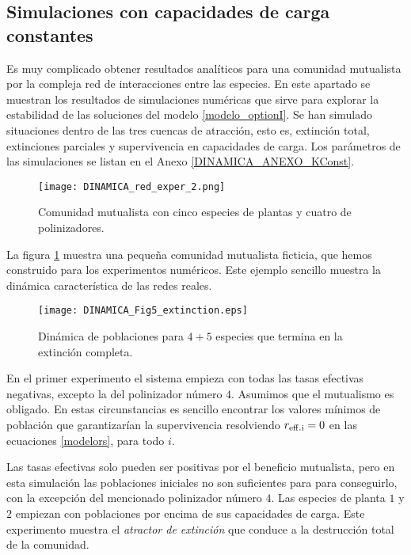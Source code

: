 \subsection{Simulaciones con capacidades de carga constantes}
\label{results_K_constante}
Es muy complicado obtener resultados analíticos para una comunidad mutualista por la compleja red de interacciones entre las especies. En este apartado se muestran los resultados de simulaciones numéricas que sirve para explorar la estabilidad de las soluciones del modelo \ref{modelo_optionI}. Se han simulado situaciones dentro de las tres cuencas de atracción, esto es, extinción total, extinciones parciales y supervivencia en capacidades de carga. Los parámetros de las simulaciones se listan en el Anexo \ref{DINAMICA_ANEXO_KConst}.

\begin{figure}[h!]
\centering
\texttt{[image: DINAMICA\_red\_exper\_2.png]}
\caption {Comunidad mutualista con cinco especies de plantas y cuatro de polinizadores.}
\label{fig:red_exper_stab1}
\end{figure}

La figura \ref{fig:red_exper_stab1} muestra una pequeña comunidad mutualista ficticia, que hemos construido para los experimentos numéricos. Este ejemplo sencillo muestra la dinámica característica de las redes reales.

\begin{figure}[ht!]
\centering
\texttt{[image: DINAMICA\_Fig5\_extinction.eps]}
\caption {Dinámica de poblaciones para $4+5$ especies que termina en la extinción completa.}
\label{fig:exper_stab1}
\end{figure}

En el primer experimento el sistema empieza con todas las tasas efectivas negativas, excepto la del polinizador número $4$. Asumimos que el mutualismo es obligado. En estas circunstancias es sencillo encontrar los valores mínimos de población que garantizarían la supervivencia resolviendo $r_{\rm{eff}.i} = 0$ en las ecuaciones \eqref{modelors}, para todo $i$.

Las tasas efectivas solo pueden ser positivas por el beneficio mutualista, pero en esta simulación las poblaciones iniciales no son suficientes para para conseguirlo, con la excepción del mencionado polinizador número $4$. Las especies de planta $1$ y $2$ empiezan con poblaciones por encima de sus capacidades de carga.
Este experimento muestra el \textit{atractor de extinción} que conduce a la destrucción total de la comunidad.

